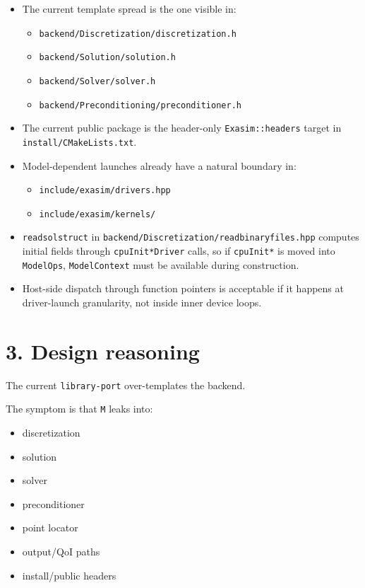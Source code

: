 \documentclass[11pt]{article}
\begin{document}
\begin{itemize}[leftmargin=*]
\item The current template spread is the one visible in:
\begin{itemize}[leftmargin=*]
\item \texttt{backend/Discretization/discretization.h}
\item \texttt{backend/Solution/solution.h}
\item \texttt{backend/Solver/solver.h}
\item \texttt{backend/Preconditioning/preconditioner.h}
\end{itemize}
\item The current public package is the header-only \texttt{Exasim::headers} target in \texttt{install/CMakeLists.txt}.
\item Model-dependent launches already have a natural boundary in:
\begin{itemize}[leftmargin=*]
\item \texttt{include/exasim/drivers.hpp}
\item \texttt{include/exasim/kernels/}
\end{itemize}
\item \texttt{readsolstruct} in \texttt{backend/Discretization/readbinaryfiles.hpp} computes initial fields through \texttt{cpuInit*Driver} calls, so if \texttt{cpuInit*} is moved into \texttt{ModelOps}, \texttt{ModelContext} must be available during construction.
\item Host-side dispatch through function pointers is acceptable if it happens at driver-launch granularity, not inside inner device loops.
\end{itemize}

\section*{3. Design reasoning}

The current \texttt{library-port} over-templates the backend.

The symptom is that \texttt{M} leaks into:

\begin{itemize}[leftmargin=*]
\item discretization
\item solution
\item solver
\item preconditioner
\item point locator
\item output/QoI paths
\item install/public headers
\end{itemize}
\end{document}
